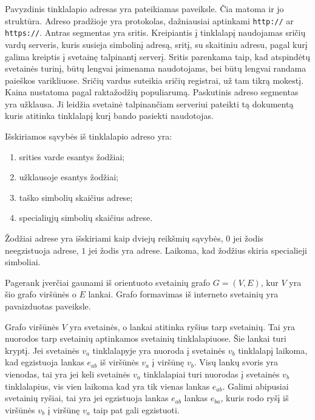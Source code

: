 Pavyzdinis tinklalapio adresas yra pateikiamas  paveiksle. Čia matoma ir jo struktūra. Adreso pradžioje yra protokolas, dažniausiai aptinkami \texttt{http://} ar \texttt{https://}. Antras segmentas yra sritis. Kreipiantis į tinklalapį naudojamas sričių vardų serveris, kuris susieja simbolinį adresą, sritį, su skaitiniu adresu, pagal kurį galima kreiptis į svetainę talpinantį serverį. Sritis parenkama taip, kad atspindėtų svetainės turinį, būtų lengvai įsimenama naudotojams, bei būtų lengvai randama paieškos varikliuose. Sričių vardus suteikia sričių registrai, už tam tikrą mokestį. Kaina nustatoma pagal raktažodžių populiarumą. Paskutinis adreso segmentas yra užklausa. Ji leidžia svetainė talpinančiam serveriui pateikti tą dokumentą kuris atitinka tinklalapį kurį bando pasiekti naudotojas.

Išskiriamos sąvybės iš tinklalapio adreso yra:
\begin{enumerate}
\item srities varde esantys žodžiai;
\item užklausoje esantys žodžiai;
\item taško simbolių skaičius adrese;
\item specialiųjų simbolių skaičius adrese.
\end{enumerate}
Žodžiai adrese yra išskiriami kaip dviejų reikšmių sąvybės, $0$ jei žodis neegzistuoja adrese, $1$ jei žodis yra adrese. Laikoma, kad žodžius skiria specialieji simboliai.

Pagerank įverčiai gaunami iš orientuoto svetainių grafo $G = (V, E)$, kur $V$ yra šio grafo viršūnės o $E$ lankai. Grafo formavimas iš interneto svetainių yra pavaizduotas  paveiksle.

Grafo viršūnės $V$ yra svetainės, o lankai atitinka ryšius tarp svetainių. Tai yra nuorodos tarp svetainių aptinkamos svetainių tinklalapiuose. Šie lankai turi kryptį. Jei svetainės $v_a$ tinklalapyje yra nuoroda į svetainės $v_b$ tinklalapį laikoma, kad egzistuoja lankas $e_{ab}$ iš viršūnės $v_a$ į viršūnę $v_b$. Visų lankų svoris yra vienodas, tai yra jei keli svetainės $v_a$ tinklalapiai turi nuorodas į svetainės $v_b$ tinklalapius, vis vien laikoma kad yra tik vienas lankas $e_{ab}$. Galimi abipusiai svetainių ryšiai, tai yra jei egzistuoja lankas $e_{ab}$ lankas $e_{ba}$, kuris rodo ryšį iš viršūnės $v_b$ į viršūnę $v_a$ taip pat gali egzistuoti.

